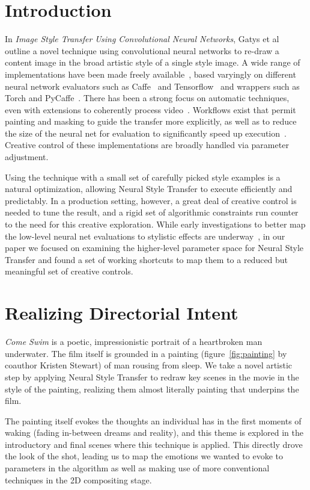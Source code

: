 \documentclass{acmsiggraph}
\begin{document}
\section{Introduction}
In \textit{Image Style Transfer Using Convolutional Neural Networks}, Gatys et al~\cite{gatys:2015} outline a novel technique using convolutional neural networks to re-draw a content image in the broad artistic style of a single style image. A wide range of implementations have been made freely available~\cite{liu:2016,johnson:2015,athalye:2015}, based varyingly on different neural network evaluators such as Caffe~\cite{jia:2014} and Tensorflow~\cite{abadi:2016} and wrappers such as Torch and PyCaffe~\cite{bahrampour:2015}. There has been a strong focus on automatic techniques, even with extensions to coherently process video~\cite{ruder:2016}. Workflows exist that permit painting and masking to guide the transfer more explicitly, as well as to reduce the size of the neural net for evaluation to significantly speed up execution~\cite{ulyanov:2016}. Creative control of these implementations are broadly handled via parameter adjustment.

Using the technique with a small set of carefully picked style examples is a natural optimization, allowing Neural Style Transfer to execute efficiently and predictably. In a production setting, however, a great deal of creative control is needed to tune the result, and a rigid set of algorithmic constraints run counter to the need for this creative exploration. While early investigations to better map the low-level neural net evaluations to stylistic effects are underway~\cite{li:2017}, in our paper we focused on examining the higher-level parameter space for Neural Style Transfer and found a set of working shortcuts to map them to a reduced but meaningful set of creative controls.

\section{Realizing Directorial Intent}
\textit{Come Swim} is a poetic, impressionistic portrait of a heartbroken man underwater. The film itself is grounded in a painting (figure~\ref{fig:painting} by coauthor Kristen Stewart) of man rousing from sleep. We take a novel artistic step by applying Neural Style Transfer to redraw key scenes in the movie in the style of the painting, realizing them almost literally painting that underpins the film.

The painting itself evokes the thoughts an individual has in the first moments of waking (fading in-between dreams and reality), and this theme is explored in the introductory and final scenes where this technique is applied. This directly drove the look of the shot, leading us to map the emotions we wanted to evoke to parameters in the algorithm as well as making use of more conventional techniques in the 2D compositing stage.
\end{document}
